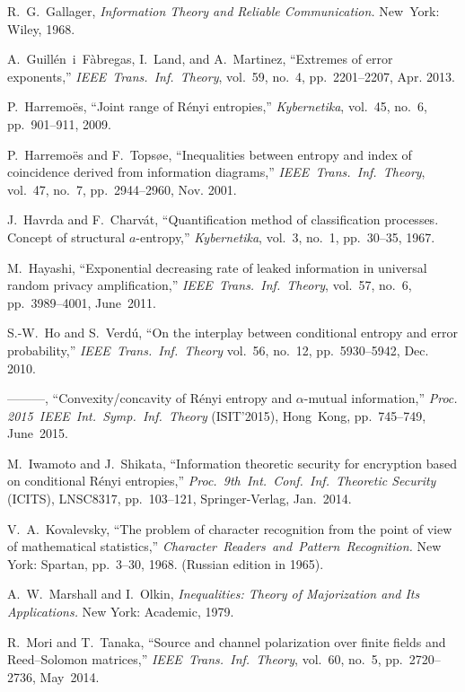 \documentclass[conference, draftcls, onecolumn]{IEEEtran}
\theoremstyle{plain}
\begin{document}
\begin{thebibliography}{99}
R.~G.~Gallager,
\emph{Information Theory and Reliable Communication.}
New~York: Wiley, 1968.

A.~Guill\'{e}n~i~F\`{a}bregas, I.~Land, and A.~Martinez,
``Extremes of error exponents,''
\emph{IEEE\ Trans.\ Inf.\ Theory},
vol.~59, no.~4, pp.~2201--2207, Apr. 2013.

P.~Harremo\"{e}s,
``Joint range of R\'{e}nyi entropies,''
\emph{Kybernetika},
vol.~45, no.~6, pp.~901--911, 2009.

P.~Harremo\"{e}s and F.~Tops{\o}e,
``Inequalities between entropy and index of coincidence derived from information diagrams,''
\emph{IEEE\ Trans.\ Inf.\ Theory},
vol.~47, no.~7, pp.~2944--2960, Nov. 2001.

J.~Havrda and F.~Charv\'{a}t,
``Quantification method of classification processes. Concept of structural $a$-entropy,''
\emph{Kybernetika},
vol.~3, no.~1, pp.~30--35, 1967.

M.~Hayashi,
``Exponential decreasing rate of leaked information in universal random privacy amplification,''
\emph{IEEE\ Trans.\ Inf.\ Theory},
vol.~57, no.~6, pp.~3989--4001, June~2011.

S.-W.~Ho and S.~Verd\'{u},
``On the interplay between conditional entropy and error probability,''
\emph{IEEE\ Trans.\ Inf.\ Theory}
vol.~56, no.~12, pp.~5930--5942, Dec. 2010.

---------,
``Convexity/concavity of R\'{e}nyi entropy and $\alpha$-mutual information,''
\emph{Proc. 2015\ IEEE\ Int.\ Symp.\ Inf.\ Theory} (ISIT'2015),
Hong~Kong, pp.~745--749, June~2015.

M.~Iwamoto and J.~Shikata,
``Information theoretic security for encryption based on conditional R\'{e}nyi entropies,''
\emph{Proc.\ 9th\ Int.\ Conf.\ Inf.\ Theoretic Security} (ICITS),
LNSC8317, pp.~103--121, Springer-Verlag, Jan.~2014.

V.~A.~Kovalevsky,
``The problem of character recognition from the point of view of mathematical statistics,''
\emph{Character\ Readers\ and\ Pattern\ Recognition.}
New York: Spartan, pp.~3--30, 1968. (Russian edition in 1965).

A.~W.~Marshall and I.~Olkin,
\emph{Inequalities: Theory of Majorization and Its Applications.}
New York: Academic, 1979.

R.~Mori and T.~Tanaka,
``Source and channel polarization over finite fields and Reed--Solomon matrices,''
\emph{IEEE\ Trans.\ Inf.\ Theory},
vol.~60, no.~5, pp.~2720--2736, May~2014.


\end{thebibliography}
\end{document}
